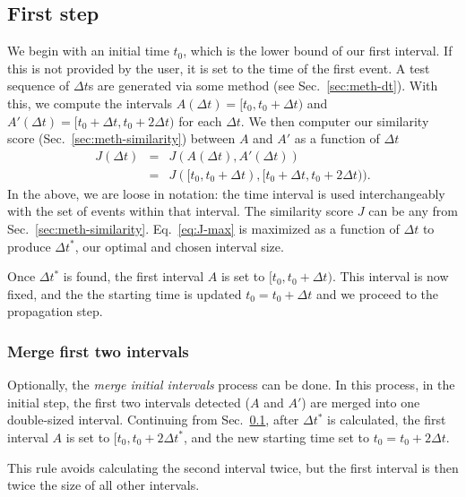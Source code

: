 \documentclass{article}
\begin{document}
\subsection{First step}
\label{sec:meth-firststep}
We begin with an initial time $t_0$, which is the lower bound of our
first interval.  If this is not provided by the user, it is set to the
time of the first event.  A test sequence of $\Delta t$s are generated
via some method (see Sec.~\ref{sec:meth-dt}).  With this, we compute
the intervals $ A(\Delta t) = [t_0, t_0+\Delta t)$ and $A'(\Delta t) =
[t_0+\Delta t, t_0+2\Delta t)$ for each $\Delta t$.  We then computer
our similarity score (Sec.~\ref{sec:meth-similarity}) between $A$ and
$A'$ as a function of $\Delta t$
\begin{eqnarray}
  J(\Delta t) &=& J(A(\Delta t), A'(\Delta t)) \nonumber \\
              &=& J([t_0, t_0+\Delta t),  [t_0+\Delta t, t_0+2\Delta t)).
              \label{eq:J-max}
\end{eqnarray}
In the above, we are loose in notation: the time interval is used
interchangeably with the set of events within that interval.  The
similarity score $J$ can be any from Sec.~\ref{sec:meth-similarity}.
Eq.~\ref{eq:J-max} is maximized as a function of $\Delta t$ to produce
$\Delta t^*$, our optimal and chosen interval size.

Once $\Delta t^*$ is found, the first interval $A$ is set to $[t_0,
t_0+\Delta t)$.  This interval is now fixed, and the the
starting time is updated $t_0 = t_0+\Delta t$ and we proceed to the
propagation step.

\subsubsection{Merge first two intervals}
\label{sec:meth-mergefirst}
Optionally, the \textit{merge initial intervals} process can be done.
In this process, in the initial step, the first two intervals detected
($A$ and $A'$) are merged into one double-sized interval.  Continuing
from Sec.~\ref{sec:meth-firststep}, after $\Delta t^*$ is calculated,
the first interval $A$ is set to $[t_0, t_0+2\Delta t^*$, and the new
starting time set to $t_0 = t_0 + 2\Delta t$.

This rule avoids calculating the second interval twice, but the first
interval is then twice the size of all other intervals.
\end{document}
